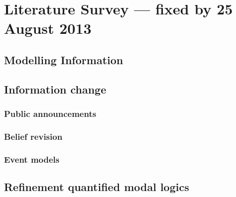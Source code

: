\section{Literature Survey --- fixed by 25 August 2013}

\subsection{Modelling Information}

\subsection{Information change}

\subsubsection{Public announcements}

\subsubsection{Belief revision}

\subsubsection{Event models}


\subsection{Refinement quantified modal logics}
